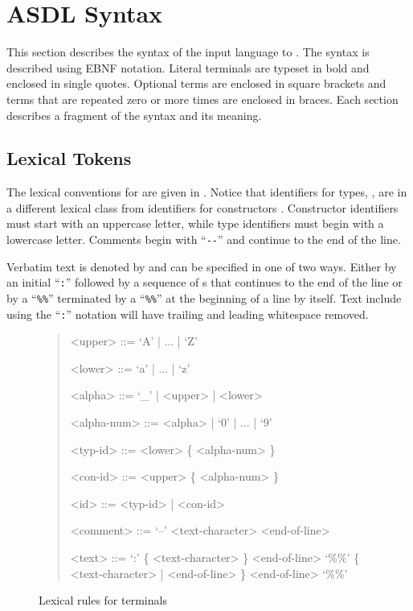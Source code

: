 %
\chapter{ASDL Syntax}
\label{chap:syntax}

This section describes the syntax of the input language to \asdlgen{}.
The syntax is described using EBNF notation.
Literal terminals are typeset in bold and enclosed in single quotes.
Optional terms are enclosed in square brackets and terms that are
repeated zero or more times are enclosed in braces.
Each section describes a fragment of the syntax and its meaning.

\section{Lexical Tokens}

The lexical conventions for \asdl{} are given in .
Notice that identifiers for types, , are in a different
lexical class from identifiers for constructors .
Constructor identifiers must start with an uppercase
letter, while type identifiers must begin with a lowercase letter.
Comments begin with ``\lstinline[language=ASDL]!--!''
and continue to the end of the line.

Verbatim text is denoted by  and can be specified in one of two ways.
Either by an initial ``\lstinline!:!'' followed by a sequence of s that
continues to the end of the line or by a ``\lstinline!%%!'' terminated by a ``\lstinline!%%!''
at the beginning of a line by itself. 
Text include using the ``\lstinline!:!'' notation will have trailing and leading 
whitespace removed.

\begin{figure}[t]
  \begin{quote}
    \begin{grammar}
      <upper>     ::= `A' | ... | `Z'

      <lower>     ::= `a' | ... | `z'

      <alpha>     ::= `_' | <upper> | <lower>

      <alpha-num> ::= <alpha> | `0' | ... | `9'

      <typ-id>    ::= <lower> \{ <alpha-num> \}

      <con-id>    ::= <upper> \{ <alpha-num> \}

      <id>        ::= <typ-id> | <con-id>

      <comment>   ::= `--' <text-character> <end-of-line>

      <text>      ::= `:' \{ <text-character> \} <end-of-line>
               \alt{} `\%\%' \{ <text-character> | <end-of-line> \} <end-of-line> `\%\%'
    \end{grammar}
  \end{quote}
  \caption{Lexical rules for \asdl{} terminals}
  \label{fig:lexical-syntax}
\end{figure}%

